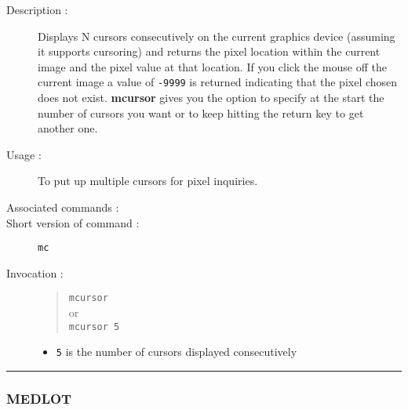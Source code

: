 \begin{description}

\item[Description :] Displays N cursors consecutively on the current
graphics device (assuming it supports cursoring) and returns the pixel
location within the current image and the pixel value at that location.
If you click the mouse off the current image a value of {\tt -9999} is
returned indicating that the pixel chosen does not exist.  {\bf mcursor}
gives you the option to specify at the start the number of cursors you
want or to keep hitting the return key to get another one.

\item[Usage :] To put up multiple cursors for pixel inquiries.
\item[Associated commands :] {\tt {}}
\item[Short version of command :] {\tt mc}
\item[Invocation :]

\begin{quote}{\tt  mcursor }\\
or \\
{\tt mcursor 5 }
\end{quote}

\begin{itemize}

\item {\tt 5} is the number of cursors displayed consecutively
\end{itemize}

\end{description}

\hrule 
\subsubsection*{\label{MEDLOT}MEDLOT}


